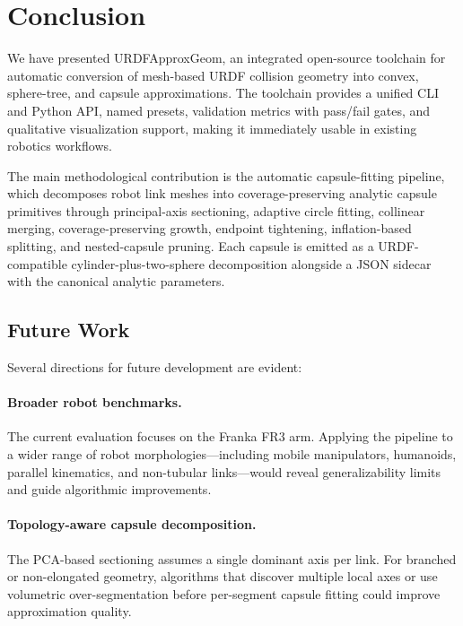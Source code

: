 \section{Conclusion}
\label{sec:conclusion}

We have presented URDFApproxGeom, an integrated open-source toolchain for automatic conversion of mesh-based URDF collision geometry into convex, sphere-tree, and capsule approximations.
The toolchain provides a unified CLI and Python API, named presets, validation metrics with pass/fail gates, and qualitative visualization support, making it immediately usable in existing robotics workflows.

The main methodological contribution is the automatic capsule-fitting pipeline, which decomposes robot link meshes into coverage-preserving analytic capsule primitives through principal-axis sectioning, adaptive circle fitting, collinear merging, coverage-preserving growth, endpoint tightening, inflation-based splitting, and nested-capsule pruning.
Each capsule is emitted as a URDF-compatible cylinder-plus-two-sphere decomposition alongside a JSON sidecar with the canonical analytic parameters.

\subsection*{Future Work}

Several directions for future development are evident:

\paragraph{Broader robot benchmarks.}
The current evaluation focuses on the Franka FR3 arm.
Applying the pipeline to a wider range of robot morphologies---including mobile manipulators, humanoids, parallel kinematics, and non-tubular links---would reveal generalizability limits and guide algorithmic improvements.

\paragraph{Topology-aware capsule decomposition.}
The PCA-based sectioning assumes a single dominant axis per link.
For branched or non-elongated geometry, algorithms that discover multiple local axes or use volumetric over-segmentation before per-segment capsule fitting could improve approximation quality.


